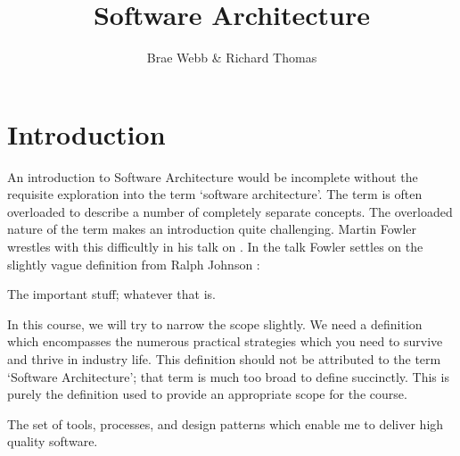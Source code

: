 \title{Software Architecture}
\author{Brae Webb \& Richard Thomas}
\date{}

\maketitle

\section{Introduction}
An introduction to Software Architecture would be incomplete without the requisite
exploration into the term `software architecture'.
The term is often overloaded to describe a number of completely separate concepts.
The overloaded nature of the term makes an introduction quite challenging.
Martin Fowler wrestles with this difficultly in his talk on .
In the talk Fowler settles on the slightly vague definition from Ralph Johnson \cite{fowler-what-is-architecture}:

\begin{definition}
The important stuff; whatever that is.
\end{definition}

In this course, we will try to narrow the scope slightly.
We need a definition which encompasses the numerous practical strategies which you need to survive and thrive in industry life.
This definition should not be attributed to the term `Software Architecture'; that term is much too broad to define succinctly.
This is purely the definition used to provide an appropriate scope for the course.

\begin{definition}
The set of tools, processes, and design patterns which enable me to deliver high quality software.
\end{definition}


